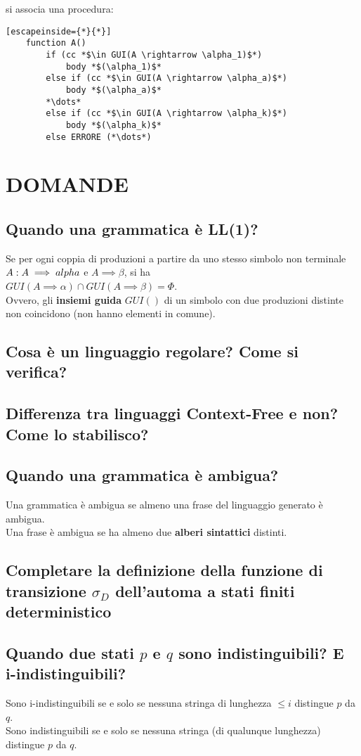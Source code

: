 \documentclass[14pt]{extarticle}
\begin{document}
si associa una procedura:
\begin{lstlisting}[escapeinside={*}{*}]
    function A()
        if (cc *$\in GUI(A \rightarrow \alpha_1)$*)
            body *$(\alpha_1)$*
        else if (cc *$\in GUI(A \rightarrow \alpha_a)$*)
            body *$(\alpha_a)$*
        *\dots*
        else if (cc *$\in GUI(A \rightarrow \alpha_k)$*)
            body *$(\alpha_k)$*
        else ERRORE (*\dots*)
\end{lstlisting}

\newpage


\section{DOMANDE}
\subsection{Quando una grammatica è LL(1)?}
Se per ogni coppia di produzioni a partire da uno stesso simbolo non terminale $A:\\
A\implies alpha$ e $A \implies \beta$, si ha\\
$GUI(A \implies \alpha) \cap GUI(A \implies \beta) = \Phi$.\\
Ovvero, gli \textbf{insiemi guida} $GUI()$ di un simbolo con due produzioni distinte non coincidono (non hanno elementi in comune).

\subsection{Cosa è un linguaggio regolare? Come si verifica?}
\subsection{Differenza tra linguaggi Context-Free e non? Come lo stabilisco?}
\subsection{Quando una grammatica è ambigua?}
Una grammatica è ambigua se almeno una frase del linguaggio generato è ambigua.\\
Una frase è ambigua se ha almeno due \textbf{alberi sintattici} distinti.
\subsection{Completare la definizione della funzione di transizione $\sigma_D$ dell'automa a stati finiti deterministico}
\subsection{Quando due stati $p$ e $q$ sono indistinguibili? E i-indistinguibili?}
Sono i-indistinguibili se e solo se nessuna stringa di lunghezza $\le i$ distingue $p$ da $q$.\\
Sono indistinguibili se e solo se nessuna stringa (di qualunque lunghezza) distingue $p$ da $q$.
\end{document}
